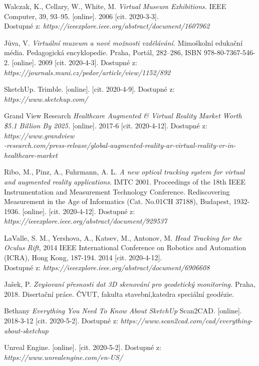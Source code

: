 \documentclass[a4paper, 12pt]{report}
\begin{document}
\begin{thebibliography}{9}
 Walczak, K., Cellary, W., White, M. \textit{Virtual Museum Exhibitions.} IEEE Computer, 39, 93–95. [online]. 2006 [cit. 2020-3-3]. \\Dostupné z: \textit{https://ieeexplore.ieee.org/abstract/document/1607962}

 Jůva, V. \textit{Virtuální muzeum a nové možnosti
vzdělávání.} Mimoškolní edukační média. Pedagogická encyklopedie. Praha, Portál, 282–286, ISBN 978-80-7367-546-2. [online]. 2009 [cit. 2020-4-3]. Dostupné z: \textit{https://journals.muni.cz/pedor/article/view/1152/892}

 SketchUp. Trimble. [online]. [cit. 2020-4-9]. Dostupné z: \textit{https://www.sketchup.com/}

 Grand View Research \textit{Healthcare Augmented \& Virtual Reality Market Worth \$5.1 Billion By 2025.} [online]. 2017-6 [cit. 2020-4-12]. Dostupné z: \textit{https://www.grandview\\-research.com/press-release/global-augmented-reality-ar-virtual-reality-vr-in-healthcare-market}

 Ribo, M., Pinz, A., Fuhrmann, A. L. \textit{A new optical tracking system for virtual and augmented reality applications}. IMTC 2001. Proceedings of the 18th IEEE Instrumentation and Measurement Technology Conference. Rediscovering Measurement in the Age of Informatics (Cat. No.01CH 37188), Budapest, 1932-1936. [online]. [cit. 2020-4-12].  Dostupné z: \textit{https://ieeexplore.ieee.org/abstract/document/929537}

 LaValle, S. M., Yershova, A., Katsev, M., Antonov, M. \textit{Head Tracking for the Oculus Rift}, 2014 IEEE International Conference on Robotics and Automation (ICRA), Hong Kong, 187-194. 2014 [cit. 2020-4-12].  \\Dostupné z: \textit{https://ieeexplore.ieee.org/abstract/document/6906608}

 Jašek, P. \textit{Zvyšovaní přesnosti dat 3D skenování pro geodetický monitoring.} Praha, 2018. Disertační práce. ČVUT, fakulta stavební,katedra speciální geodézie.

 Bethany \textit{Everything You Need To Know About SketchUp} Scan2CAD. [online]. 2018-3-12 [cit. 2020-5-2]. Dostupné z: \textit{https://www.scan2cad.com/cad/everything-about-sketchup}

 Unreal Engine. [online]. [cit. 2020-5-2]. Dostupné z: \textit{https://www.unrealengine.com/en-US/}


\end{thebibliography}
\end{document}
